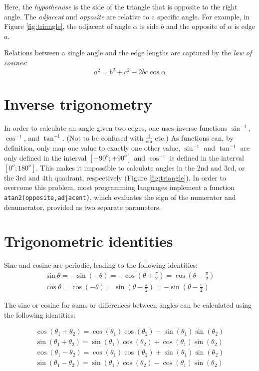 \documentclass[paper=6.14in:9.21in,pagesize=pdftex,11pt,twoside,openright]{scrbook}
\begin{document}
Here, the \emph{hypothenuse} is the side of the triangle that is opposite to the right angle. The \emph{adjacent} and \emph{opposite} are relative to a specific angle. For example, in Figure \ref{fig:triangle}, the adjacent of angle $\alpha$ is side $b$ and the opposite of $\alpha$ is edge $a$.

Relations between a single angle and the edge lengths are captured by the \emph{law of cosines}:
\begin{equation}
a^2=b^2+c^2-2bc\cos{\alpha}
\end{equation}

\section{Inverse trigonometry}
In order to calculate an angle given two edges, one uses inverse functions $\sin^{-1}$, $\cos^{-1}$, and $\tan^{-1}$. (Not to be confused with $\frac{1}{\sin}$ etc.) As functions can, by definition, only map one value to exactly one other value, $\sin^{-1}$ and $\tan^{-1}$ are only defined in the interval $[-90^o;+90^o]$ and $\cos^{-1}$ is defined in the interval $[0^o;180^o]$. This makes it impossible to calculate angles in the 2nd and 3rd, or the 3rd and 4th quadrant, respectively (Figure \ref{fig:triangle}).
In order to overcome this problem, most programming languages implement a function \texttt{atan2(opposite,adjacent)}, which evaluates the sign of the numerator and denumerator, provided as two separate parameters.

\section{Trigonometric identities}
Sine and cosine are periodic, leading to the following identities:
\begin{eqnarray}
\sin\theta=-\sin(-\theta)=-\cos(\theta+\frac{\pi}{2})=\cos(\theta-\frac{\pi}{2})\\
\cos\theta=\cos(-\theta)=\sin(\theta+\frac{\pi}{2})=-\sin(\theta-\frac{\pi}{2})
\end{eqnarray}

The sine or cosine for sums or differences between angles can be calculated using the following identities:

\begin{eqnarray}
\cos(\theta_1+\theta_2)=\cos(\theta_1)\cos(\theta_2)-\sin(\theta_1)\sin(\theta_2)\\
\sin(\theta_1+\theta_2)=\sin(\theta_1)\cos(\theta_2)+\cos(\theta_1)\sin(\theta_2)\\
\cos(\theta_1-\theta_2)=\cos(\theta_1)\cos(\theta_2)+\sin(\theta_1)\sin(\theta_2)\\
\sin(\theta_1-\theta_2)=\sin(\theta_1)\cos(\theta_2)-\cos(\theta_1)\sin(\theta_2)
\end{eqnarray}
\end{document}
